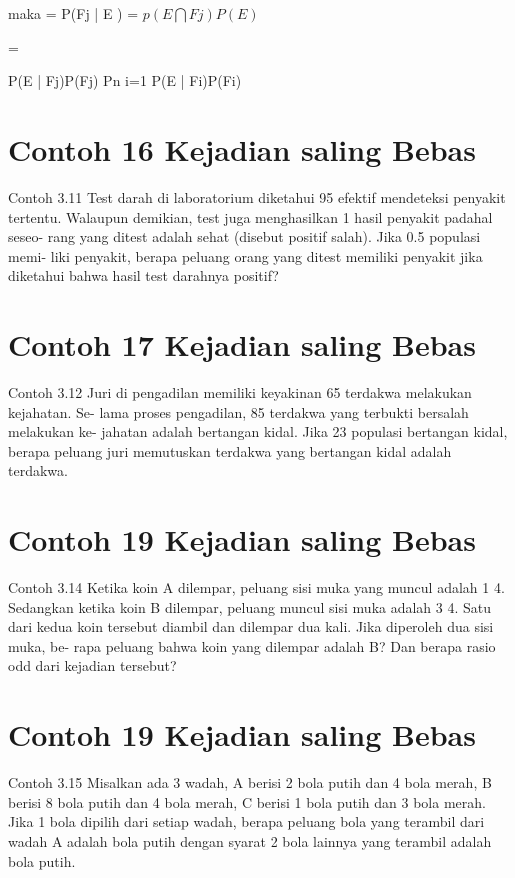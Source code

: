 \documentclass[11pt,fleqn]{book} %
\begin{document}
{{maka =  
P(Fj | E ) =
$ p(E \bigcap  Fj)P(E) $

= 

P(E | Fj)P(Fj) Pn i=1 P(E | Fi)P(Fi)
\vspace{0.5in}
\section{Contoh 16 Kejadian saling Bebas}

Contoh 3.11 Test darah di laboratorium diketahui 95 efektif mendeteksi penyakit tertentu. Walaupun demikian, test juga menghasilkan 1 hasil penyakit padahal seseo- rang yang ditest adalah sehat (disebut positif salah). Jika 0.5 populasi memi- liki penyakit, berapa peluang orang yang ditest memiliki penyakit jika diketahui bahwa hasil test darahnya positif?

\vspace{0.5in}
\section{Contoh 17 Kejadian saling Bebas}

Contoh 3.12 Juri di pengadilan memiliki keyakinan 65 terdakwa melakukan kejahatan. Se- lama proses pengadilan, 85 terdakwa yang terbukti bersalah melakukan ke- jahatan adalah bertangan kidal. Jika 23 populasi bertangan kidal, berapa peluang juri memutuskan terdakwa yang bertangan kidal adalah terdakwa.

\section{Contoh 19 Kejadian saling Bebas}

Contoh 3.14 Ketika koin A dilempar, peluang sisi muka yang muncul adalah 1 4. Sedangkan ketika koin B dilempar, peluang muncul sisi muka adalah 3 4. Satu dari kedua koin tersebut diambil dan dilempar dua kali. Jika diperoleh dua sisi muka, be- rapa peluang bahwa koin yang dilempar adalah B? Dan berapa rasio odd dari kejadian tersebut?

\vspace{0.5in}
\section{Contoh 19 Kejadian saling Bebas}

Contoh 3.15 Misalkan ada 3 wadah, A berisi 2 bola putih dan 4 bola merah, B berisi 8 bola putih dan 4 bola merah, C berisi 1 bola putih dan 3 bola merah. Jika 1 bola dipilih dari setiap wadah, berapa peluang bola yang terambil dari wadah A adalah bola putih dengan syarat 2 bola lainnya yang terambil adalah bola putih.

}}
\end{document}
